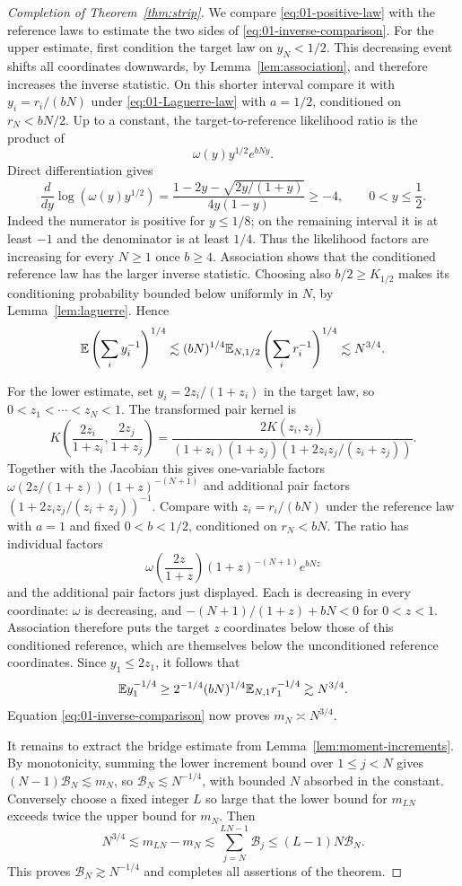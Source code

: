 \begin{proof}[Completion of Theorem~\ref{thm:strip}]
We compare \eqref{eq:01-positive-law} with the reference laws to
estimate the two sides of \eqref{eq:01-inverse-comparison}.
For the upper estimate, first condition the target law on
$y_N<1/2$. This decreasing event shifts all coordinates downwards,
by Lemma~\ref{lem:association}, and therefore increases the inverse
statistic. On this shorter interval compare it with
$y_i=r_i/(bN)$ under \eqref{eq:01-Laguerre-law} with $a=1/2$,
conditioned on $r_N<bN/2$. Up to a constant, the target-to-reference
likelihood ratio is the product of
\[
 \omega(y)y^{1/2}e^{bNy}.
\]
Direct differentiation gives
\[
 \frac{d}{dy}\log(\omega(y)y^{1/2})
 =\frac{1-2y-\sqrt{2y/(1+y)}}{4y(1-y)}\ge-4,
 \qquad 0<y\le\frac12.
\]
Indeed the numerator is positive for $y\le1/8$; on the remaining
interval it is at least $-1$ and the denominator is at least $1/4$.
Thus the likelihood factors are increasing for every $N\ge1$ once
$b\ge4$. Association shows that the conditioned reference
law has the larger inverse statistic. Choosing also $b/2\ge K_{1/2}$
makes its conditioning probability bounded below uniformly in $N$,
by Lemma~\ref{lem:laguerre}. Hence
\[
 \mathbb E\left(\sum_i y_i^{-1}\right)^{1/4}
 \lesssim (bN)^{1/4}
          \mathbb E_{N,1/2}\left(\sum_i r_i^{-1}\right)^{1/4}
 \lesssim N^{3/4}.
\]

For the lower estimate, set $y_i=2z_i/(1+z_i)$ in the target law,
so $0<z_1<\cdots<z_N<1$. The transformed pair kernel is
\[
 K\left(\frac{2z_i}{1+z_i},\frac{2z_j}{1+z_j}\right)
 =\frac{2K(z_i,z_j)}
 {(1+z_i)(1+z_j)(1+2z_iz_j/(z_i+z_j))}.
\]
Together with the Jacobian this gives one-variable factors
$\omega(2z/(1+z))(1+z)^{-(N+1)}$ and additional pair factors
$(1+2z_iz_j/(z_i+z_j))^{-1}$.
Compare with $z_i=r_i/(bN)$ under the reference law with $a=1$ and
fixed $0<b<1/2$, conditioned on $r_N<bN$. The ratio has individual
factors
\[
 \omega\left(\frac{2z}{1+z}\right)(1+z)^{-(N+1)}e^{bNz}
\]
and the additional pair factors just displayed. Each is decreasing
in every coordinate: $\omega$ is decreasing, and
$-(N+1)/(1+z)+bN<0$ for $0<z<1$. Association therefore puts the
target $z$ coordinates below those of this conditioned reference,
which are themselves below the unconditioned reference coordinates.
Since $y_1\le2z_1$, it follows that
\[
 \mathbb E y_1^{-1/4}
 \ge 2^{-1/4}(bN)^{1/4}\mathbb E_{N,1}r_1^{-1/4}
 \gtrsim N^{3/4}.
\]
Equation \eqref{eq:01-inverse-comparison} now proves
$m_N\asymp N^{3/4}$.

It remains to extract the bridge estimate from
Lemma~\ref{lem:moment-increments}. By monotonicity, summing the lower
increment bound over $1\le j<N$ gives
$(N-1)\mathcal B_N\lesssim m_N$, so
$\mathcal B_N\lesssim N^{-1/4}$, with bounded $N$ absorbed in the
constant. Conversely choose a fixed integer $L$ so large that the
lower bound for $m_{LN}$ exceeds twice the upper bound for $m_N$.
Then
\[
 N^{3/4}\lesssim m_{LN}-m_N
 \lesssim\sum_{j=N}^{LN-1}\mathcal B_j
 \le(L-1)N\mathcal B_N.
\]
This proves $\mathcal B_N\gtrsim N^{-1/4}$ and completes all assertions
of the theorem.
\end{proof}
